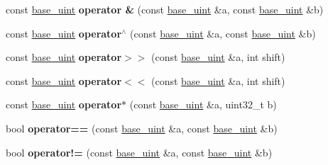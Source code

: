 \begin{DoxyCompactItemize}
\item 
\mbox{\label{classbase__uint_aa75064c879a5c59352c31ce6884dbf83}} 
const \mbox{\hyperlink{classbase__uint}{base\+\_\+uint}} {\bfseries operator \&} (const \mbox{\hyperlink{classbase__uint}{base\+\_\+uint}} \&a, const \mbox{\hyperlink{classbase__uint}{base\+\_\+uint}} \&b)
\item 
\mbox{\label{classbase__uint_aa9c66282ad78846e8310984aeb2df49d}} 
const \mbox{\hyperlink{classbase__uint}{base\+\_\+uint}} {\bfseries operator$^\wedge$} (const \mbox{\hyperlink{classbase__uint}{base\+\_\+uint}} \&a, const \mbox{\hyperlink{classbase__uint}{base\+\_\+uint}} \&b)
\item 
\mbox{\label{classbase__uint_a9d619adcbf9ad5539f5e98f739edd15d}} 
const \mbox{\hyperlink{classbase__uint}{base\+\_\+uint}} {\bfseries operator$>$$>$} (const \mbox{\hyperlink{classbase__uint}{base\+\_\+uint}} \&a, int shift)
\item 
\mbox{\label{classbase__uint_acee16d973ae59087cd962720773f53dd}} 
const \mbox{\hyperlink{classbase__uint}{base\+\_\+uint}} {\bfseries operator$<$$<$} (const \mbox{\hyperlink{classbase__uint}{base\+\_\+uint}} \&a, int shift)
\item 
\mbox{\label{classbase__uint_a3490f0aef12712d434cda33f913b586f}} 
const \mbox{\hyperlink{classbase__uint}{base\+\_\+uint}} {\bfseries operator$\ast$} (const \mbox{\hyperlink{classbase__uint}{base\+\_\+uint}} \&a, uint32\+\_\+t b)
\item 
\mbox{\label{classbase__uint_aafca305decdfd2ded4688213ab4a55fa}} 
bool {\bfseries operator==} (const \mbox{\hyperlink{classbase__uint}{base\+\_\+uint}} \&a, const \mbox{\hyperlink{classbase__uint}{base\+\_\+uint}} \&b)
\item 
\mbox{\label{classbase__uint_a3cc3bccf252004fbbd2b96dc769378e7}} 
bool {\bfseries operator!=} (const \mbox{\hyperlink{classbase__uint}{base\+\_\+uint}} \&a, const \mbox{\hyperlink{classbase__uint}{base\+\_\+uint}} \&b)
\item 
\mbox{\label{classbase__uint_ac59719bd052d5dc2afcc35ae4a8843ab}} 

\end{DoxyCompactItemize}

